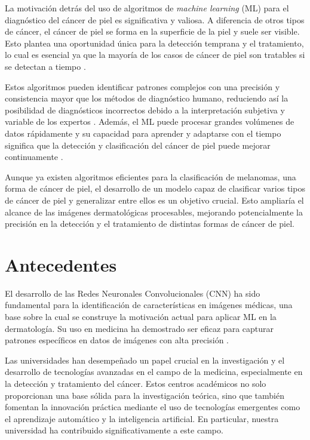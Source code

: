 La motivación detrás del uso de algoritmos de \textit{machine learning} (ML) para el diagnóstico del cáncer de piel es significativa y valiosa. A diferencia de otros tipos de cáncer, el cáncer de piel se forma en la superficie de la piel y suele ser visible. Esto plantea una oportunidad única para la detección temprana y el tratamiento, lo cual es esencial ya que la mayoría de los casos de cáncer de piel son tratables si se detectan a tiempo .

Estos algoritmos pueden identificar patrones complejos con una precisión y consistencia mayor que los métodos de diagnóstico humano, reduciendo así la posibilidad de diagnósticos incorrectos debido a la interpretación subjetiva y variable de los expertos . Además, el ML puede procesar grandes volúmenes de datos rápidamente y su capacidad para aprender y adaptarse con el tiempo significa que la detección y clasificación del cáncer de piel puede mejorar continuamente .

Aunque ya existen algoritmos eficientes para la clasificación de melanomas, una forma de cáncer de piel, el desarrollo de un modelo capaz de clasificar varios tipos de cáncer de piel y generalizar entre ellos es un objetivo crucial. Esto ampliaría el alcance de las imágenes dermatológicas procesables, mejorando potencialmente la precisión en la detección y el tratamiento de distintas formas de cáncer de piel.


\section*{Antecedentes}

El desarrollo de las Redes Neuronales Convolucionales (CNN) ha sido fundamental para la identificación de características en imágenes médicas, una base sobre la cual se construye la motivación actual para aplicar ML en la dermatología. Su uso en medicina ha demostrado ser eficaz para capturar patrones específicos en datos de imágenes con alta precisión .

Las universidades han desempeñado un papel crucial en la investigación y el desarrollo de tecnologías avanzadas en el campo de la medicina, especialmente en la detección y tratamiento del cáncer. Estos centros académicos no solo proporcionan una base sólida para la investigación teórica, sino que también fomentan la innovación práctica mediante el uso de tecnologías emergentes como el aprendizaje automático y la inteligencia artificial. En particular, nuestra universidad ha contribuido significativamente a este campo.

